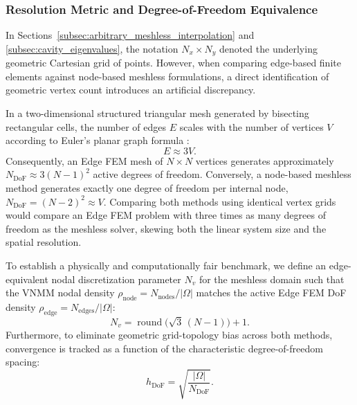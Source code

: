 \documentclass[preprint,12pt]{elsarticle}
\begin{document}
\subsubsection{Resolution Metric and Degree-of-Freedom Equivalence}
In Sections~\ref{subsec:arbitrary_meshless_interpolation} and \ref{subsec:cavity_eigenvalues}, the notation $N_x \times N_y$ denoted the underlying geometric Cartesian grid of points. However, when comparing edge-based finite elements against node-based meshless formulations, a direct identification of geometric vertex count introduces an artificial discrepancy. 

In a two-dimensional structured triangular mesh generated by bisecting rectangular cells, the number of edges $E$ scales with the number of vertices $V$ according to Euler's planar graph formula \cite{deberg2008computational}:
\begin{equation}
    E \approx 3V.
    \label{eq:euler_edge_vertex}
\end{equation}
Consequently, an Edge FEM mesh of $N \times N$ vertices generates approximately $N_{\mathrm{DoF}} \approx 3(N-1)^2$ active degrees of freedom. Conversely, a node-based meshless method generates exactly one degree of freedom per internal node, $N_{\mathrm{DoF}} = (N - 2)^2 \approx V$. Comparing both methods using identical vertex grids would compare an Edge FEM problem with three times as many degrees of freedom as the meshless solver, skewing both the linear system size and the spatial resolution.

To establish a physically and computationally fair benchmark, we define an edge-equivalent nodal discretization parameter $N_v$ for the meshless domain such that the VNMM nodal density $\rho_{\mathrm{node}} = N_{\mathrm{nodes}} / |\Omega|$ matches the active Edge FEM DoF density $\rho_{\mathrm{edge}} = N_{\mathrm{edges}} / |\Omega|$:
\begin{equation}
    N_v = \operatorname{round}\bigl(\sqrt{3}\,(N - 1)\bigr) + 1.
    \label{eq:edge_equivalent_nv}
\end{equation}
Furthermore, to eliminate geometric grid-topology bias across both methods, convergence is tracked as a function of the characteristic degree-of-freedom spacing:
\begin{equation}
    h_{\mathrm{DoF}} = \sqrt{\frac{|\Omega|}{N_{\mathrm{DoF}}}}.
    \label{eq:h_dof_definition}
\end{equation}
\end{document}
